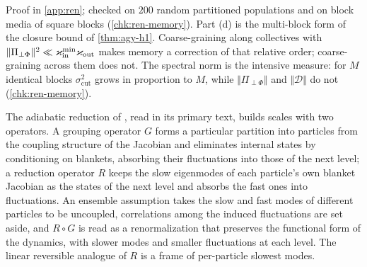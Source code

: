 Proof in \cref{app:ren}; checked on $200$ random partitioned populations and on block media of square blocks (\cref{chk:ren-memory}). Part (d) is the multi-block form of the closure bound of \cref{thm:agy-h1}. Coarse-graining along collectives with $\Vert\Pi_{\perp\Phi}\Vert^2\ll\varkappa_{\mathrm{in}}^{\min}\varkappa_{\mathrm{out}}$ makes memory a correction of that relative order; coarse-graining across them does not. The spectral norm is the intensive measure: for $M$ identical blocks $\sigma^2_{\mathrm{cut}}$ grows in proportion to $M$, while $\Vert\Pi_{\perp\Phi}\Vert$ and $\Vert\mathcal D\Vert$ do not (\cref{chk:ren-memory}).

The adiabatic reduction of \citet{friston2019free}, read in its primary text, builds scales with two operators. A grouping operator $G$ forms a particular partition into particles from the coupling structure of the Jacobian and eliminates internal states by conditioning on blankets, absorbing their fluctuations into those of the next level; a reduction operator $R$ keeps the slow eigenmodes of each particle's own blanket Jacobian as the states of the next level and absorbs the fast ones into fluctuations. An ensemble assumption takes the slow and fast modes of different particles to be uncoupled, correlations among the induced fluctuations are set aside, and $R\circ G$ is read as a renormalization that preserves the functional form of the dynamics, with slower modes and smaller fluctuations at each level. The linear reversible analogue of $R$ is a frame of per-particle slowest modes.

